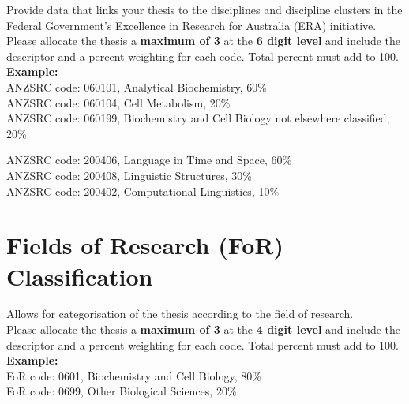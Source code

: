 \begin{instructional}
    Provide data that links your thesis to the disciplines and discipline clusters in the Federal Government’s Excellence in Research for Australia (ERA) initiative.\\
    
    \noindent
    Please allocate the thesis a \textbf{maximum of 3} \href{http://www.abs.gov.au/Ausstats/abs@.nsf/Latestproducts/6BB427AB9696C225CA2574180004463E?opendocument}{\color{blue}{Australian and New Zealand Standard Research Classifications (ANZSRC) codes}} at the \textbf{6 digit level} and include the descriptor and a percent weighting for each code. Total percent must add to 100.\\


\textbf{Example:}\\


    ANZSRC code: 060101, Analytical Biochemistry, 60\% \\
    \indent ANZSRC code: 060104, Cell Metabolism, 20\% \\
    \indent ANZSRC code: 060199, Biochemistry and Cell Biology not elsewhere classified, 20\%
\end{instructional}


ANZSRC code: 200406, Language in Time and Space, 60\% \\
ANZSRC code: 200408, Linguistic Structures, 30\% \\
ANZSRC code: 200402, Computational Linguistics, 10\%



\section*{Fields of Research (FoR) Classification}

\begin{instructional}
    Allows for categorisation of the thesis according to the field of research. \\
    
    \noindent
    Please allocate the thesis a \textbf{maximum of 3} \href{http://www.abs.gov.au/Ausstats/abs@.nsf/Latestproducts/6BB427AB9696C225CA2574180004463E?opendocument}{\color{blue}{Fields of Research (FoR) Codes}} at the \textbf{4 digit level} and include the descriptor and a percent weighting for each code. Total percent must add to 100. \\

\textbf{Example:}\\

FoR code: 0601, Biochemistry and Cell Biology, 80\% \\
\indent FoR code: 0699, Other Biological Sciences, 20\%
\end{instructional}

